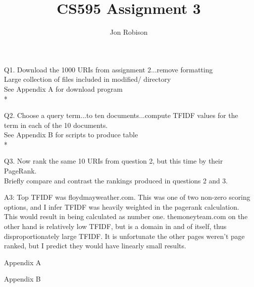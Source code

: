 \documentclass{article}
\begin{document}
\author{Jon Robison}
\title{CS595 Assignment 3}
\maketitle

Q1. Download the 1000 URIs from assignment 2...remove formatting \\
Large collection of files included in modified/ directory \\
See Appendix A for download program
\\*

Q2. Choose a query term...to ten documents...compute TFIDF values for the term
in each of the 10 documents. \\

See Appendix B for scripts to produce table
\\*

Q3. Now rank the same 10 URIs from question 2, but this time by their
PageRank. \\

Briefly compare and contrast the rankings produced in questions 2
and 3.

A3: Top TFIDF was floydmayweather.com. This was one of two non-zero scoring
options, and I infer TFIDF was heavily weighted in the pagerank calculation.
This would result in being calculated as number one. themoneyteam.com on the
other hand is relatively low TFIDF, but is a domain in and of itself, thus
disproportionately large TFIDF. It is unfortunate the other pages weren't
page ranked, but I predict they would have linearly small results.

\newpage
\appendix
Appendix A


\newpage
Appendix B



\end{document}
